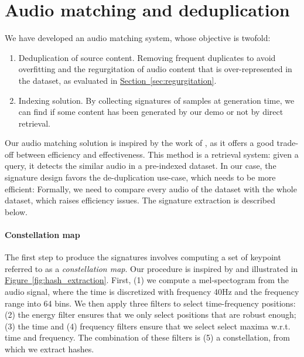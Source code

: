 \section{Audio matching and deduplication}
\label{sec:audiomatching}

We have developed an audio matching system, whose objective is twofold:
\begin{enumerate}
\item Deduplication of source content. Removing frequent duplicates to avoid overfitting and the regurgitation of audio content that is over-represented in the dataset, as evaluated in \hyperref[sec:regurgitation]{Section~\ref{sec:regurgitation}}.  \\[-1.7em]
\item Indexing solution. By collecting signatures of samples at generation time, we can find if some content has been generated by our demo or not by direct retrieval. 
\end{enumerate}

Our audio matching solution is inspired by the work of \cite{wang2003industrial}, as it offers a good trade-off between efficiency and effectiveness. This method is a retrieval system: given a query, it detects the similar audio in a pre-indexed dataset. In our case, the signature design favors the de-duplication use-case, which needs to be more efficient: Formally, we need to compare every audio of the dataset with the whole dataset, which raises efficiency issues.  The signature extraction is described below. 


\paragraph{Constellation map}
The first step to produce the signatures involves computing a set of keypoint referred to as a \emph{constellation map}. Our procedure is inspired by \cite{wang2003industrial} and  illustrated in \hyperref[fig:hash_extraction]{Figure~\ref{fig:hash_extraction}}. First, (1) we compute a mel-spectogram from the audio signal, where the time is discretized with frequency 40Hz and the frequency range into 64 bins. We then apply three filters to select time-frequency positions: (2) the energy filter ensures that we only select positions that are robust enough; (3) the time and (4) frequency filters ensure that we select  select maxima w.r.t. time and frequency. The combination of these filters is (5) a constellation, from which we extract hashes. 
\medskip

